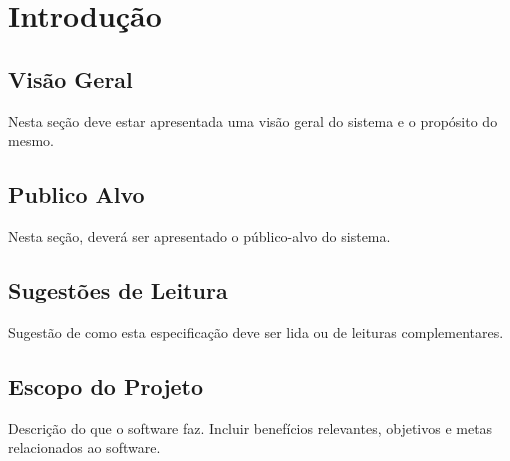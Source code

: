 \chapter{Introdução}

\section{Visão Geral}

Nesta seção deve estar apresentada uma visão geral do sistema e o propósito do mesmo.

\section{Publico Alvo}

Nesta seção, deverá ser apresentado o público-alvo do sistema.

\section{Sugestões de Leitura}

Sugestão de como esta especificação deve ser lida ou de leituras complementares.

\section{Escopo do Projeto}

Descrição do que o software faz. Incluir benefícios relevantes, objetivos e metas relacionados ao software.